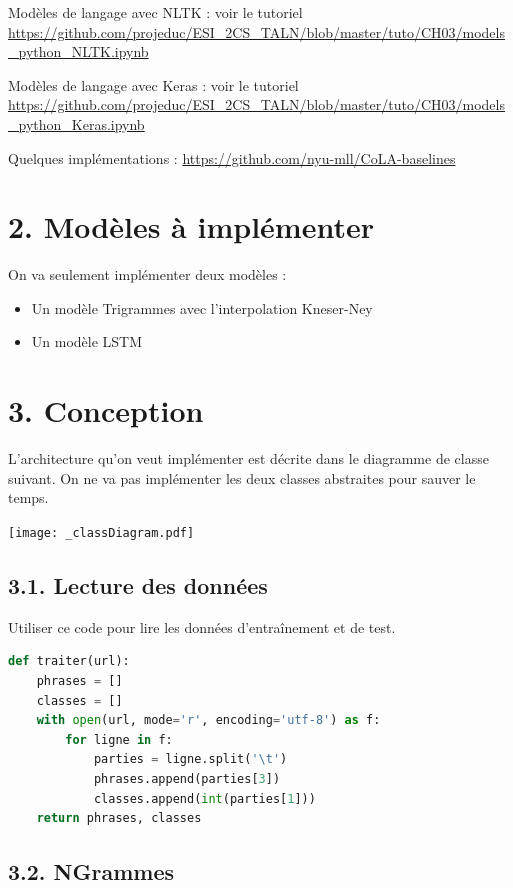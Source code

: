 \documentclass[11pt, a4paper]{article}
\begin{document}
Modèles de langage avec NLTK : voir le tutoriel \url{https://github.com/projeduc/ESI_2CS_TALN/blob/master/tuto/CH03/models_python_NLTK.ipynb}

Modèles de langage avec Keras : voir le tutoriel 
\url{https://github.com/projeduc/ESI_2CS_TALN/blob/master/tuto/CH03/models_python_Keras.ipynb}

Quelques implémentations : \url{https://github.com/nyu-mll/CoLA-baselines}

\section*{2. Modèles à implémenter}

On va seulement implémenter deux modèles :
\begin{itemize}
	\item Un modèle Trigrammes avec l'interpolation Kneser-Ney
	\item Un modèle LSTM
\end{itemize}

\section*{3. Conception}

L'architecture qu'on veut implémenter est décrite dans le diagramme de classe suivant.
On ne va pas implémenter les deux classes abstraites pour sauver le temps.

\texttt{[image: \_classDiagram.pdf]}

\subsection*{3.1. Lecture des données}

Utiliser ce code pour lire les données d'entraînement et de test.

\begin{lstlisting}[language=Python]
def traiter(url):
    phrases = []
    classes = []
    with open(url, mode='r', encoding='utf-8') as f:
        for ligne in f:
            parties = ligne.split('\t')
            phrases.append(parties[3])
            classes.append(int(parties[1]))
    return phrases, classes
\end{lstlisting}

\subsection*{3.2. NGrammes}
\end{document}
